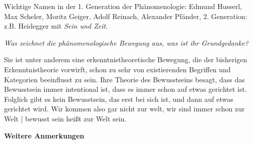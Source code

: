 \documentclass[a4paper, emulatestandardclasses]{scrartcl}
\begin{document}
Wichtige Namen in der 1. Generation der Phänomenologie: Edmund Husserl, Max Scheler, Moritz Geiger, Adolf Reinach, Alexander Pfänder, 2. Generation: z.B. Heidegger mit \emph{Sein und Zeit}.\newline

\noindent \emph{Was zeichnet die phänomenologische Bewegung aus, was ist ihr Grundgedanke?}

Sie ist unter anderem eine erkenntnistheoretische Bewegung, die der bisherigen Erkenntnistheorie vorwirft, schon zu sehr von existierenden Begriffen und Kategorien beeinflusst zu sein. Ihre Theorie des Bewusstseins besagt, dass das Bewusstsein immer intentional ist, dass es immer schon auf etwas gerichtet ist. Folglich gibt es kein Bewusstsein, das erst bei sich ist, und dann auf etwas gerichtet wird. Wir kommen also gar nicht zur welt, wir sind immer schon zur Welt | bewusst sein heißt zur Welt sein.\newline

\noindent\textbf{Weitere Anmerkungen}
\end{document}
